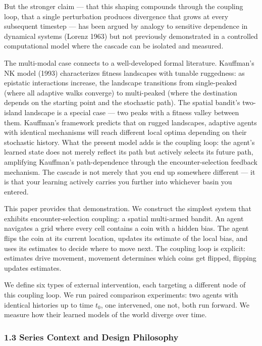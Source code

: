 \documentclass[
]{article}
\begin{document}
But the stronger claim --- that this shaping compounds through the
coupling loop, that a single perturbation produces divergence that grows
at every subsequent timestep --- has been argued by analogy to sensitive
dependence in dynamical systems (Lorenz 1963) but not previously
demonstrated in a controlled computational model where the cascade can
be isolated and measured.

The multi-modal case connects to a well-developed formal literature.
Kauffman's NK model (1993) characterizes fitness landscapes with tunable
ruggedness: as epistatic interactions increase, the landscape
transitions from single-peaked (where all adaptive walks converge) to
multi-peaked (where the destination depends on the starting point and
the stochastic path). The spatial bandit's two-island landscape is a
special case --- two peaks with a fitness valley between them.
Kauffman's framework predicts that on rugged landscapes, adaptive agents
with identical mechanisms will reach different local optima depending on
their stochastic history. What the present model adds is the coupling
loop: the agent's learned state does not merely reflect its path but
actively selects its future path, amplifying Kauffman's path-dependence
through the encounter-selection feedback mechanism. The cascade is not
merely that you end up somewhere different --- it is that your learning
actively carries you further into whichever basin you entered.

This paper provides that demonstration. We construct the simplest system
that exhibits encounter-selection coupling: a spatial multi-armed
bandit. An agent navigates a grid where every cell contains a coin with
a hidden bias. The agent flips the coin at its current location, updates
its estimate of the local bias, and uses its estimates to decide where
to move next. The coupling loop is explicit: estimates drive movement,
movement determines which coins get flipped, flipping updates estimates.

We define six types of external intervention, each targeting a different
node of this coupling loop. We run paired comparison experiments: two
agents with identical histories up to time \(t_0\), one intervened, one
not, both run forward. We measure how their learned models of the world
diverge over time.

\subsubsection{1.3 Series Context and Design
Philosophy}\label{series-context-and-design-philosophy}
\end{document}
